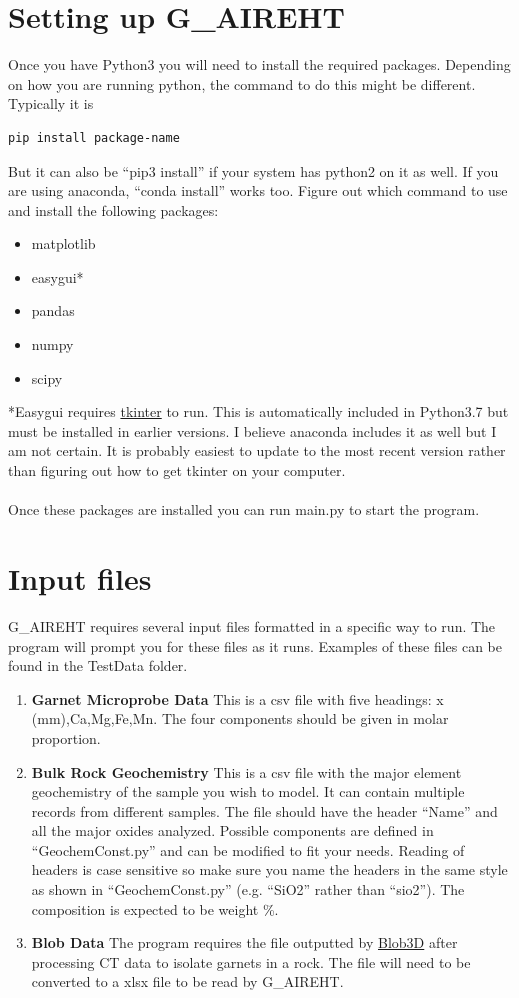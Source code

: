 \documentclass[12pt]{article}
\begin{document}
\section{Setting up G\_AIREHT}
Once you have Python3 you will need to install the required packages. Depending on how you are running python, the command to do this might be different. Typically it is 
\begin{verbatim}
pip install package-name
\end{verbatim}
But it can also be ``pip3 install'' if your system has python2 on it as well. If you are using anaconda, ``conda install'' works too. Figure out which command to use and install the following packages:
\begin{itemize}
\item[--] matplotlib
\item[--] easygui*
\item[--] pandas
\item[--] numpy
\item[--] scipy
\end{itemize}
*Easygui requires \href{https://docs.python.org/3/library/tkinter.html}{tkinter} to run. This is automatically included in Python3.7 but must be installed in earlier versions. I believe anaconda includes it as well but I am not certain. It is probably easiest to update to the most recent version rather than figuring out how to get tkinter on your computer.
\\
\\
Once these packages are installed you can run main.py to start the program.

\section{Input files}\label{input}
G\_AIREHT requires several input files formatted in a specific way to run. The program will prompt you for these files as it runs. Examples of these files can be found in the TestData folder.
\begin{enumerate}
  \item \textbf{Garnet Microprobe Data} This is a csv file with five headings: x (mm),Ca,Mg,Fe,Mn. The four components should be given in molar proportion.
  \item \textbf{Bulk Rock Geochemistry} This is a csv file with the major element geochemistry of the sample you wish to model. It can contain multiple records from different samples. The file should have the header ``Name'' and all the major oxides analyzed. Possible components are defined in ``GeochemConst.py'' and can be modified to fit your needs. Reading of headers is case sensitive so make sure you name the headers in the same style as shown in ``GeochemConst.py'' (e.g. ``SiO2'' rather than ``sio2''). The composition is expected to be weight \%.
  \item \textbf{Blob Data} The program requires the file outputted by \href{https://www.ctlab.geo.utexas.edu/software/blob3d/}{Blob3D} after processing CT data to isolate garnets in a rock. The file will need to be converted to a xlsx file to be read by G\_AIREHT.
\end{enumerate}
\end{document}
